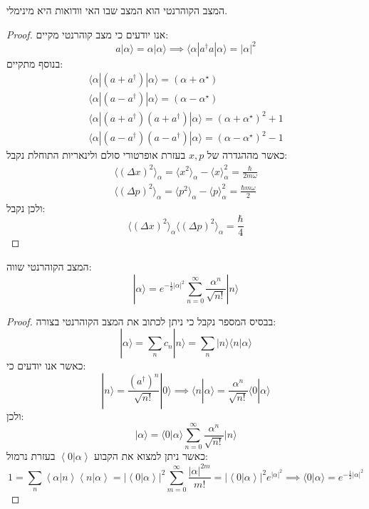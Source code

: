 \documentclass{tstextbook}
\begin{document}
\begin{proposition}
המצב הקוהרנטי הוא המצב שבו האי וודואות היא מינימלי.

\end{proposition}
\begin{proof}
אנו יודעים כי מצב קוהרנטי מקיים:
$$a|\alpha\rangle=\alpha|\alpha\rangle \implies \langle\alpha|a^{\dagger}a|\alpha\rangle=|\alpha|^{2}$$
בנוסף מתקיים:
$$\begin{array}{c}{{\langle\alpha|(a+a^{\dagger})|\alpha\rangle=(\alpha+\alpha^{\star})}}\\ {{\langle\alpha|(a-a^{\dagger})|\alpha\rangle=(\alpha-\alpha^{\star})}}\\ {{\langle\alpha|(a+a^{\dagger})(a+a^{\dagger})|\alpha\rangle=(\alpha+\alpha^{\star})^{2}+1}}\\ {{\langle\alpha|(a-a^{\dagger})(a-a^{\dagger})|\alpha\rangle=(\alpha-\alpha^{\star})^{2}-1}}\end{array}$$
כאשר מההגדרה של \(x,p\) בעזרת אופרטורי סולם ולינאריות התוחלת נקבל:
$$\begin{array}{l}{{\langle(\Delta x)^{2}\rangle_{\alpha}=\langle x^{2}\rangle_{\alpha}-\langle x\rangle_{\alpha}^{2}={\frac{\hbar}{2m\omega}}}}\\ {{\langle(\Delta p)^{2}\rangle_{\alpha}=\langle p^{2}\rangle_{\alpha}-\langle p\rangle_{\alpha}^{2}={\frac{\hbar m\omega}{2}}}}\end{array}$$
ולכן נקבל:
$$\langle(\Delta x)^{2}\rangle_{\alpha}\langle(\Delta p)^{2}\rangle_{\alpha}=\frac{\hbar}{4}$$

\end{proof}
\begin{proposition}
המצב הקוהרנטי שווה:
$$|\alpha\rangle=e^{-{\frac{1}{2}}|\alpha|^{2}}\sum_{n=0}^{\infty}{\frac{\alpha^{n}}{\sqrt{n!}}}|n\rangle$$

\end{proposition}
\begin{proof}
בבסיס המספר נקבל כי ניתן לכתוב את המצב הקוהרנטי בצורה:
$$|\alpha\rangle=\sum_{n}c_{n}|n\rangle=\sum_{n}|n\rangle\langle n|\alpha\rangle$$
כאשר אנו יודעים כי:
$$|n\rangle=\frac{\left( a^{\dagger} \right)^{n}}{\sqrt{n!}}|0\rangle\implies \langle n|\alpha\rangle={\frac{\alpha^{n}}{\sqrt{n!}}}\langle0|\alpha\rangle$$
ולכן:
$$|\alpha\rangle=\langle0|\alpha\rangle\sum_{n=0}^{\infty}\frac{\alpha^{n}}{\sqrt{n!}}|n\rangle$$
כאשר ניתן למצוא את הקבוע \(\left\langle  0|\alpha  \right\rangle\) בעזרת נרמול:
$$1=\sum_{n}\left\langle \alpha|n \right\rangle\left\langle  n|\alpha \right\rangle=|\left\langle 0|\alpha \right\rangle|^{2}\sum_{m=0}^{\infty}{\frac{|\alpha|^{2m}}{m!}}=|\left\langle 0|\alpha \right\rangle|^{2}e^{|\alpha|^{2}}\implies\langle0|\alpha\rangle=e^{-{\frac{1}{2}}|\alpha|^{2}}$$

\end{proof}
\end{document}
